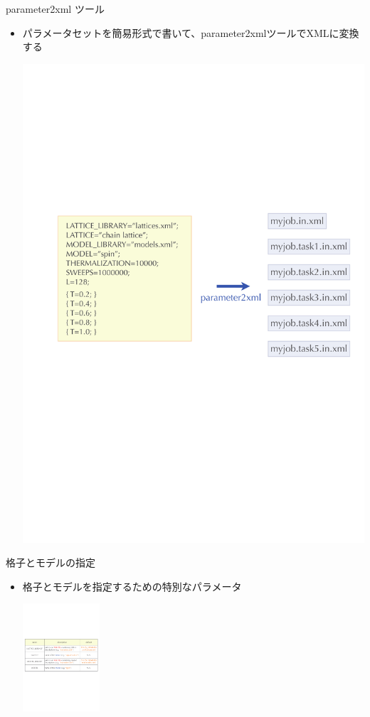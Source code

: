 \begin{frame}{parameter2xml ツール}
  \begin{itemize}
  \item パラメータセットを簡易形式で書いて、parameter2xmlツールでXMLに変換する
  \begin{center}
    \includegraphics[height=.6\textheight]{simulation4.pdf}
  \end{center}
  \end{itemize}
\end{frame}

\begin{frame}{格子とモデルの指定}
  \begin{itemize}
  \item 格子とモデルを指定するための特別なパラメータ
  \begin{center}
    \includegraphics[height=4cm]{simulation5.pdf}
  \end{center}
  \end{itemize}
\end{frame}

